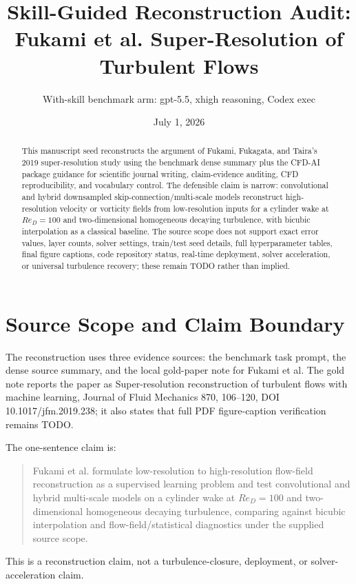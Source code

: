 \documentclass[11pt]{article}
\title{Skill-Guided Reconstruction Audit: Fukami et al. Super-Resolution of Turbulent Flows}
\author{With-skill benchmark arm: gpt-5.5, xhigh reasoning, Codex exec}
\date{July 1, 2026}
\begin{document}
\maketitle

\begin{abstract}
This manuscript seed reconstructs the argument of Fukami, Fukagata, and Taira's 2019 super-resolution study using the benchmark dense summary plus the CFD-AI package guidance for scientific journal writing, claim-evidence auditing, CFD reproducibility, and vocabulary control. The defensible claim is narrow: convolutional and hybrid downsampled skip-connection/multi-scale models reconstruct high-resolution velocity or vorticity fields from low-resolution inputs for a cylinder wake at $Re_D=100$ and two-dimensional homogeneous decaying turbulence, with bicubic interpolation as a classical baseline. The source scope does not support exact error values, layer counts, solver settings, train/test seed details, full hyperparameter tables, final figure captions, code repository status, real-time deployment, solver acceleration, or universal turbulence recovery; these remain TODO rather than implied.
\end{abstract}

\section{Source Scope and Claim Boundary}
The reconstruction uses three evidence sources: the benchmark task prompt, the dense source summary, and the local gold-paper note for Fukami et al. The gold note reports the paper as Super-resolution reconstruction of turbulent flows with machine learning, Journal of Fluid Mechanics 870, 106--120, DOI 10.1017/jfm.2019.238; it also states that full PDF figure-caption verification remains TODO.

The one-sentence claim is:
\begin{quote}
Fukami et al. formulate low-resolution to high-resolution flow-field reconstruction as a supervised learning problem and test convolutional and hybrid multi-scale models on a cylinder wake at $Re_D=100$ and two-dimensional homogeneous decaying turbulence, comparing against bicubic interpolation and flow-field/statistical diagnostics under the supplied source scope.
\end{quote}

This is a reconstruction claim, not a turbulence-closure, deployment, or solver-acceleration claim.
\end{document}
